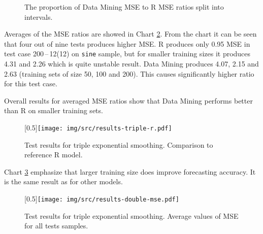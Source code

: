         \begin{figure}[H]
            \begin{center}
                \caption{The proportion of Data Mining MSE to R MSE ratios split into intervals.}
                \label{img:results-triple-pie}
            \end{center}
        \end{figure}

        Averages of the MSE ratios are showed in Chart \ref{img:results-triple-r}. From the chart it can be seen that
        four out of nine tests produces higher MSE. R produces only 0.95 MSE in test case 200\,--\,12(12) on
        \texttt{sine} sample, but for smaller training sizes it produces 4.31 and 2.26 which is quite unstable result.
        Data Mining produces 4.07, 2.15 and 2.63 (training sets of size 50, 100 and 200). This causes significantly
        higher ratio for this test case.

        Overall results for averaged MSE ratios show that Data Mining performs better than R on smaller training sets.

        \begin{figure}[H]
            \begin{center}
                \scalebox{0.65}[0.5]{\texttt{[image: img/src/results-triple-r.pdf]}}
                \caption{Test results for triple exponential smoothing. Comparison to reference R model.}
                \label{img:results-triple-r}
            \end{center}
        \end{figure}

        Chart \ref{img:results-triple-mse} emphasize that larger training size does improve forecasting accuracy. It is
        the same result as for other models.

        \begin{figure}[H]
            \begin{center}
                \scalebox{0.65}[0.5]{\texttt{[image: img/src/results-double-mse.pdf]}}
                \caption{Test results for triple exponential smoothing. Average values of MSE for all tests samples.}
                \label{img:results-triple-mse}
            \end{center}
        \end{figure}

